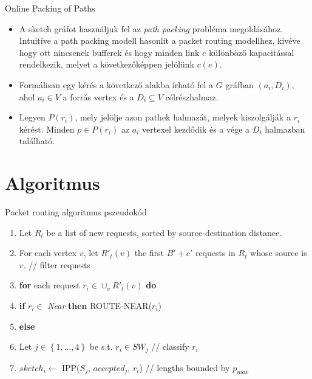 \documentclass[10pt]{beamer}
\begin{document}
\begin{frame}{Online Packing of Paths}
  \begin{itemize}
  	\item A sketch gráfot használjuk fel az \textit{path packing} probléma megoldásához. Intuitíve a path packing modell hasonlít a packet routing modellhez, kivéve hogy ott nincsenek bufferek és hogy minden link $ e $ különböző kapacitással rendelkezik, melyet a következőképpen jelölünk $ c(e) $.
	\item Formálisan egy kérés a következő alakba írható fel a $ G $ gráfban $ (a_i, D_i) $, ahol $ a_i \in V $ a forrás vertex és a $ D_i \subseteq V $ célrészhalmaz.
    \item Legyen $ P(r_i) $, mely jelölje azon pathek halmazát, melyek kiszolgálják a $ r_i $ kérést. Minden $ p \in P(r_i) $ az $ a_i $ vertexel kezdődik és a vége a $ D_i $ halmazban található.
  \end{itemize}
\end{frame}

\section{Algoritmus}

\begin{frame}{Packet routing algoritmus pszeudokód}
  \begin{enumerate}
  	\item Let $ R_t $ be a list of new requests, sorted by source-destination distance.
  	\item For each vertex $ v $, let $ R'_t(v) $  the first $ B' + c' $ requests in $ R_t $ whose source is $ v $. // filter requests
  	\item \textbf{for} each request $ r_i \in \cup_v R'_t(v) $ \textbf{do}
  	\item \quad \textbf{if} $ r_i \in $ \textit{Near} \textbf{then} ROUTE-NEAR($ r_i $)
  	\item \quad \textbf{else}
  	\item \quad \quad Let $ j \in \left\lbrace 1,\dots,4 \right\rbrace  $ be s.t. $ r_i \in SW_j $ // classify $ r_i $
  	\item \quad \quad $ sketch_i \leftarrow $ IPP($ S_j $, $ accepted_j $, $ r_i$) // lengths bounded by $ p_{max} $
  	\setcounter{enumTemp}{\theenumi}
  \end{enumerate}
\end{frame}
\end{document}
